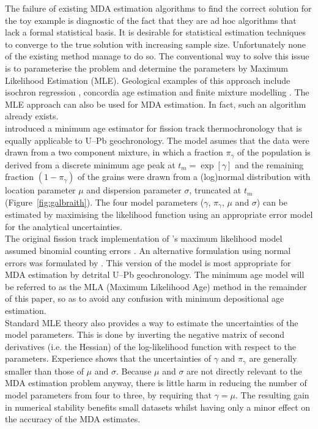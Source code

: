 \documentclass{article}
\begin{document}
The failure of existing MDA estimation algorithms to find the correct
solution for the toy example is diagnostic of the fact that they are
ad hoc algorithms that lack a formal statistical basis. It is
desirable for statistical estimation techniques to converge to the
true solution with increasing sample size. Unfortunately none of the
existing method manage to do so. The conventional way to solve this
issue is to parameterise the problem and determine the parameters by
Maximum Likelihood Estimation (MLE). Geological examples of this
approach include isochron regression
\citep{titterington1979,york2004}, concordia age estimation
\citep{ludwig1998} and finite mixture modelling
\citep{galbraith1990b,sambridge1994}. The MLE approach can also be
used for MDA estimation. In fact, such an algorithm already exists.\\

\citet{galbraith1993} introduced a minimum age estimator for fission
track thermochronology that is equally applicable to U--Pb
geochronology. The model asumes that the data were drawn from a two
component mixture, in which a fraction $\pi_\gamma$ of the population
is derived from a discrete minimum age peak at $t_m = \exp[\gamma]$
and the remaining fraction $(1 - \pi_\gamma)$ of the grains were drawn
from a (log)normal distribution with location parameter $\mu$ and
dispersion parameter $\sigma$, truncated at $t_m$
(Figure~\ref{fig:galbraith}). The four model parameters ($\gamma$,
$\pi_\gamma$, $\mu$ and $\sigma$) can be estimated by maximising the
likelihood function using an appropriate error model for the
analytical uncertainties.\\

The original fission track implementation of \citet{galbraith1993}'s
maximum likelihood model assumed binomial counting errors
\citep{touw1997}.  An alternative formulation using normal errors was
formulated by \citet[][p.107]{galbraith2005}. This version of the
model is most appropriate for MDA estimation by detrital U--Pb
geochronology. The minimum age model will be referred to as the MLA
(Maximum Likelihood Age) method in the remainder of this paper, so as
to avoid any confusion with minimum depositional age estimation.\\

Standard MLE theory also provides a way to estimate the uncertainties
of the model parameters. This is done by inverting the negative matrix
of second derivatives (i.e. the Hessian) of the log-likelihood
function with respect to the parameters. Experience shows that the
uncertainties of $\gamma$ and $\pi_\gamma$ are generally smaller than
those of $\mu$ and $\sigma$. Because $\mu$ and $\sigma$ are not
directly relevant to the MDA estimation problem anyway, there is
little harm in reducing the number of model parameters from four to
three, by requiring that $\gamma = \mu$. The resulting gain in
numerical stability benefits small datasets whilst having only a minor
effect on the accuracy of the MDA estimates.\\
\end{document}
